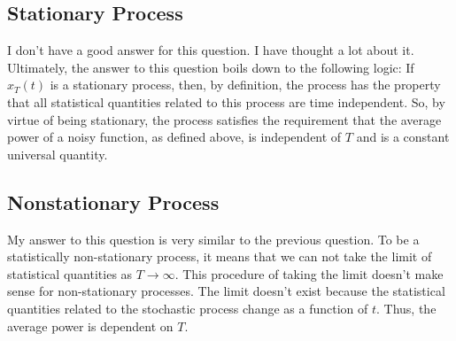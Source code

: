 \begin{homeworkProblem}
   \subsection{Stationary Process}
   \label{sub:stationary_process}
   I don't have a good answer for this question. I have thought a lot about it.
   Ultimately, the answer to this question boils down to the following logic: If
   $ x_{T}(t) $ is a stationary process, then, by definition, the process has
   the property that all statistical quantities related to this process are time
   independent. So, by virtue of being stationary, the process satisfies the
   requirement that the average power of a noisy function, as defined above, is
   independent of $ T $ and is a constant universal quantity.
   \subsection{Nonstationary Process}
   \label{sub:nonstationary_process}
   My answer to this question is very similar to the previous question. To be a
   statistically non-stationary process, it means that we can not take the limit
   of statistical quantities as $ T \to \infty $. This procedure of taking
   the limit doesn't make sense for non-stationary processes. The limit doesn't
   exist because the statistical quantities related to the stochastic process
   change as a function of $ t $. Thus, the average power is dependent on $ T $.
   \clearpage

\end{homeworkProblem}
